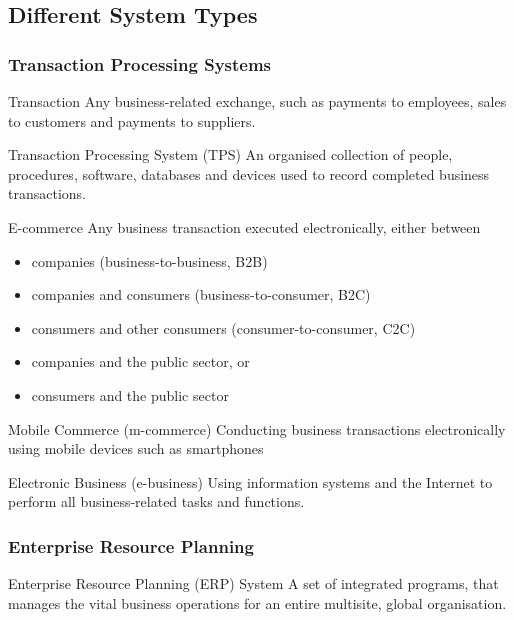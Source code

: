 \documentclass[\main/notes.tex]{subfiles}
\begin{document}
			\subsection{Different System Types}
				\subsubsection{Transaction Processing Systems}
					\begin{definition}{Transaction}
						Any business-related exchange, such as payments to employees, sales to customers and payments to suppliers.
					\end{definition}
					\begin{definition}{Transaction Processing System (TPS)}
						An organised collection of people, procedures, software, databases and devices used to record completed business transactions.
					\end{definition}
					\begin{definition}{E-commerce}
						Any business transaction executed electronically, either between
						\begin{itemize}
							\item companies (business-to-business, B2B)
							\item companies and consumers (business-to-consumer, B2C)
							\item consumers and other consumers (consumer-to-consumer, C2C)
							\item companies and the public sector, or
							\item consumers and the public sector
						\end{itemize}
					\end{definition}
					\begin{definition}{Mobile Commerce (m-commerce)}
						Conducting business transactions electronically using mobile devices such as smartphones
					\end{definition}
					\begin{definition}{Electronic Business (e-business)}
						Using information systems and the Internet to perform all business-related tasks and functions.
					\end{definition}
				\subsubsection{Enterprise Resource Planning}
					\begin{definition}{Enterprise Resource Planning (ERP) System}
						A set of integrated programs, that manages the vital business operations for an entire multisite, global organisation. 
					\end{definition}
\end{document}
